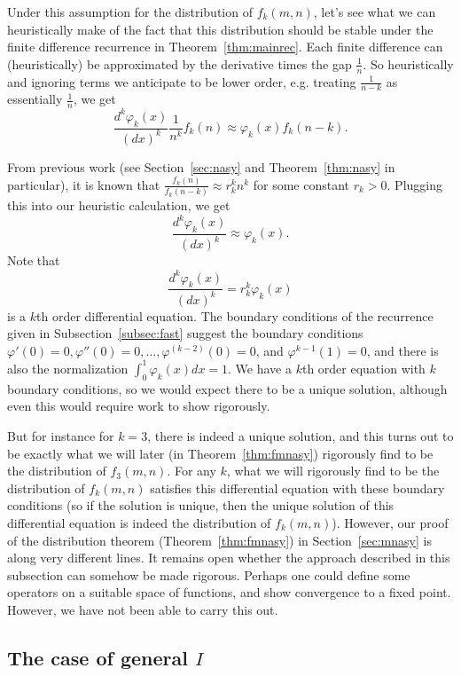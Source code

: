 \documentclass{amsart}
\theoremstyle{definition}
\begin{document}
Under this assumption for the distribution of $f_k(m,n)$, let's see what we can heuristically make of the fact that this distribution should be stable under the finite difference recurrence in Theorem~\ref{thm:mainrec}. Each finite difference can (heuristically) be approximated by the derivative times the gap $\frac{1}{n}$. So heuristically and ignoring terms we anticipate to be lower order, e.g. treating $\frac{1}{n-k}$ as essentially $\frac{1}{n}$, we get \[\frac{d^k \varphi_k(x)}{(dx)^k}\frac{1}{n^k}f_k(n)\approx \varphi_k(x)f_k(n-k).\]

From previous work (see Section~\ref{sec:nasy} and Theorem~\ref{thm:nasy} in particular), it is known that $\frac{f_k(n)}{f_k(n-k)}\approx r_k^k n^k$ for some constant $r_k>0$. Plugging this into our heuristic calculation, we get
\[\frac{d^k \varphi_k(x)}{(dx)^k}\approx \varphi_k(x).\]
Note that 
\[\frac{d^k \varphi_k(x)}{(dx)^k}= r_k^k\varphi_k(x)\]
is a $k$th order differential equation. The boundary conditions of the recurrence given in Subsection~\ref{subsec:fast} suggest the boundary conditions $\varphi'(0)=0, \varphi''(0)=0,\ldots, \varphi^{(k-2)}(0)=0$, and $\varphi^{k-1}(1)=0$, and there is also the normalization $\int_{0}^1\varphi_k(x) dx=1$. We have a $k$th order equation with $k$ boundary conditions, so we would expect there to be a unique solution, although even this would require work to show rigorously.

But for instance for $k=3$, there is indeed a unique solution, and this turns out to be exactly what we will later (in Theorem~\ref{thm:fmnasy}) rigorously find to be the distribution of $f_3(m,n)$. For any $k$, what we will rigorously find to be the distribution of $f_k(m,n)$ satisfies this differential equation with these boundary conditions (so if the solution is unique, then the unique solution of this differential equation is indeed the distribution of $f_k(m,n)$). However, our proof of the distribution theorem (Theorem~\ref{thm:fmnasy}) in Section~\ref{sec:mnasy} is along very different lines. It remains open whether the approach described in this subsection can somehow be made rigorous. Perhaps one could define some operators on a suitable space of functions, and show convergence to a fixed point. However, we have not been able to carry this out.



\subsection{The case of general $I$}\label{subsec:general}
\end{document}
